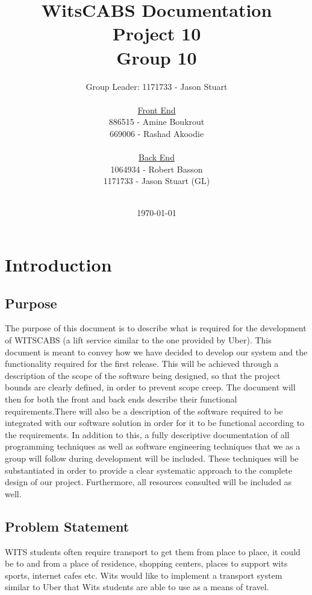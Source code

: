 \documentclass[a4paper,12pt]{article}
\begin{document}
\title{WitsCABS Documentation\\Project 10\\Group 10\\}
\author{ Group Leader: 1171733 - Jason Stuart\\ \\ \underline{Front End} \\886515 - Amine Boukrout\\ 669006 - Rashad Akoodie\\\\\underline{Back End}\\1064934 - Robert Basson\\ 1171733 - Jason Stuart (GL)\\ \\}
\date{\today}
\maketitle
\newpage
\tableofcontents
\newpage
\section{Introduction}
\subsection{Purpose}
The purpose of this document is to describe what is required for the development of WITSCABS (a lift service similar to the one provided by Uber). This document is meant to convey how we have decided to develop our system and the functionality required for the first release. This will be achieved through a description of the scope of the software being designed, so that the project bounds are clearly defined, in order to prevent scope creep. The document will then for both the front and back ends describe their functional requirements.There will also be a description of the software required to be integrated with our software solution in order for it to be functional according to the requirements. 
In addition to this, a fully descriptive documentation of all programming techniques as well as software engineering techniques that we as a group will follow during development will be included. These techniques will be substantiated in order to provide a clear systematic approach to the complete design of our project. Furthermore, all resources consulted will be included as well.
\subsection{Problem Statement}
WITS students often require transport to get them from place to place, it could be to and from a place of residence, shopping centers, places to support wits sports, internet cafes etc. Wits would like to implement a transport system similar to Uber that Wits students are able to use as a means of travel.
\end{document}

